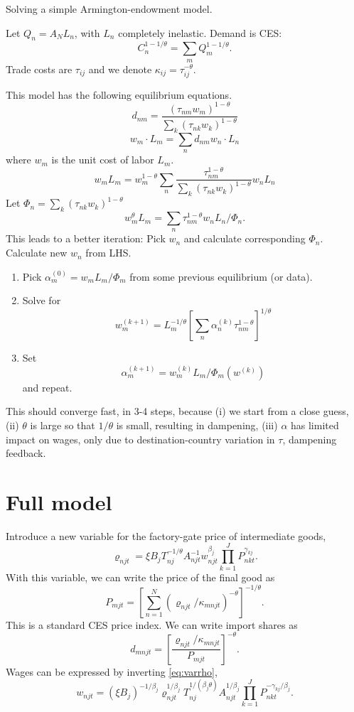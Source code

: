 \documentclass{article}
\begin{document}
Solving a simple Armington-endowment model.

Let $Q_n = A_NL_n$, with $L_n$ completely inelastic. Demand is CES:
\[
C_n^{1-1/\theta} = \sum_m Q_m^{1-1/\theta}.
\]
Trade costs are $\tau_{ij}$ and we denote $\kappa_{ij} = \tau_{ij}^{-\theta}$.

This model has the following equilibrium equations.
\[
d_{nm} = 
	\frac
	{(\tau_{nm}w_m)^{1-\theta}}
	{\sum_k (\tau_{nk} w_k)^{1-\theta}}
\]
\[
w_m \cdot L_m = \sum_n d_{nm} w_n \cdot L_n
\]
where $w_m$ is the unit cost of labor $L_m$.
\[
w_m L_m = w_m^{1-\theta}
\sum_n 	\frac
	{\tau_{nm}^{1-\theta}}
	{\sum_k (\tau_{nk} w_k)^{1-\theta}}
 w_n L_n
\]
Let $\Phi_n = \sum_k (\tau_{nk} w_k)^{1-\theta}$ 
\[
w_m^\theta L_m = 
\sum_n 	
	{\tau_{nm}^{1-\theta}}
 w_n L_n/\Phi_n.
\]
This leads to a better iteration: Pick $w_n$ and calculate corresponding $\Phi_n$. Calculate new $w_n$ from LHS. 

\begin{enumerate}
	\item Pick $\alpha_m^{(0)} = w_mL_m/\Phi_m$ from some previous equilibrium (or data).
	\item Solve for
	\[
	w_m^{(k+1)} = L_m^{-1/\theta} 
		\left[
		\sum_n \alpha_n^{(k)} \tau_{nm}^{1-\theta}
		\right]^{1/\theta}
	\]
	\item Set 
	\[
	\alpha_m^{(k+1)} = w_m^{(k)} L_m/\Phi_m(w^{(k)})
	\]
	and repeat.
\end{enumerate}
This should converge fast, in 3-4 steps, because (i) we start from a close guess, (ii) $\theta$ is large so that $1/\theta$ is small, resulting in dampening, (iii) $\alpha$ has limited impact on wages, only due to destination-country variation in $\tau$, dampening feedback.

\section{Full model}
Introduce a new variable for the factory-gate price of intermediate goods,
\begin{equation}\label{eq:varrho}
	\varrho_{njt} = \xi B_j T_{nj}^{-1/\theta} A_{njt}^{-1} w_{njt}^{\beta_j} \prod_{k=1}^J P_{nkt}^{\gamma_{kj}}.
\end{equation}
With this variable, we can write the price of the final good as
\begin{equation}\label{eq:price}
	P_{mjt} = \left[
		\sum_{n=1}^N (\varrho_{njt}/\kappa_{mnjt})^{-\theta}
		\right]^{-1/\theta}.
\end{equation}
This is a standard CES price index. We can write import shares as
\begin{equation}\label{eq:import_share}
	d_{mnjt} = \left[
	\frac
	{\varrho_{njt}/\kappa_{mnjt}}
	{P_{mjt}}
	\right]^{-\theta}.
\end{equation}
Wages can be expressed by inverting \eqref{eq:varrho},
\begin{equation}\label{eq:wage}
	w_{njt} = (\xi B_j)^{-1/\beta_j}
	\varrho_{njt}^{1/\beta_j}  
	T_{nj}^{1/(\beta_j\theta)}A_{njt}^{1/\beta_j} 
	\prod_{k=1}^J P_{nkt}^{-\gamma_{kj}/\beta_j}.
\end{equation}
\end{document}
